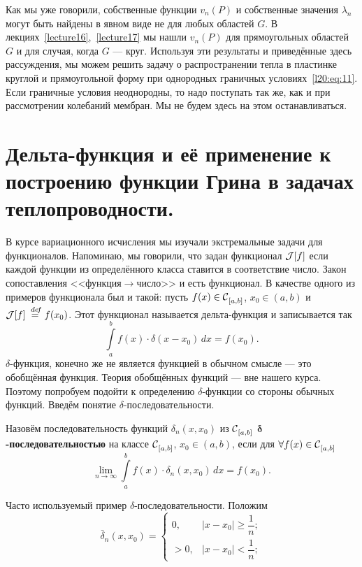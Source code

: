 Как мы уже говорили, собственные функции $v_n(P)$ и собственные значения $\lambda_n$ могут быть найдены в явном виде не для любых областей $G$. В лекциях~\ref{lecture16},~\ref{lecture17} мы нашли $v_n(P)$ для прямоугольных областей $G$ и для случая, когда $G$ --- круг. Используя эти результаты и приведённые здесь рассуждения, мы можем решить задачу о распространении тепла в пластинке круглой и прямоугольной форму при однородных граничных условиях~\eqref{l20:eq:11}. Если граничные условия неоднородны, то надо поступать так же, как и при рассмотрении колебаний мембран. Мы не будем здесь на этом останавливаться.

\section[Дельта-функция.]{Дельта-функция и её применение к построению функции Грина в задачах теплопроводности.}
\label{lecture20section3}
В курсе вариационного исчисления мы изучали экстремальные задачи для функционалов. Напоминаю, мы говорили, что задан функционал $\J[f]$ если каждой функции из определённого класса ставится в соответствие число. Закон сопоставления <<функция$\rightarrow$число>> и есть функционал. В качестве одного из примеров функционала был и такой: пусть $f(x)\in\Cfn[{[a,b]}]{}$, $x_0\in(a,b)$ и $\J[f]\eqdef f(x_0)$. Этот функционал называется дельта-функция и записывается так
\begin{equation}\label{l20:eq:19}
	\int\limits_a^b f(x)\cdot\delta(x-x_0)\,dx=f(x_0).
\end{equation} 
$\delta$-функция, конечно же не является функцией в обычном смысле --- это обобщённая функция. Теория обобщённых функций --- вне нашего курса. Поэтому попробуем подойти к определению $\delta$-функции со стороны обычных функций. Введём понятие $\delta$-последовательности.
\begin{_definition}
	Назовём последовательность функций $\delta_n(x,x_0)$ из $\Cfn[{[a,b]}]{}$  \textbf{$\bm{\delta}$-последовательностью} на классе $\Cfn[{[a,b]}]{}$, $x_0\in(a,b)$, если для $\forall f(x)\in\Cfn[{[a,b]}]{}$
	\begin{equation}\label{l20:eq:20}
		\lim\limits_{n\to\infty}\int\limits_a^b f(x)\cdot\delta_n(x,x_0)\,dx=f(x_0).
	\end{equation}
\end{_definition}
Часто используемый пример $\delta$-последовательности. Положим
\begin{equation*}
	\bar{\delta}_n(x,x_0)=\begin{cases}
		0,&|x-x_0|\geqslant\dfrac{1}{n};\\[7pt]
		>0,&|x-x_0|<\dfrac{1}{n};
	\end{cases}
\end{equation*} 
